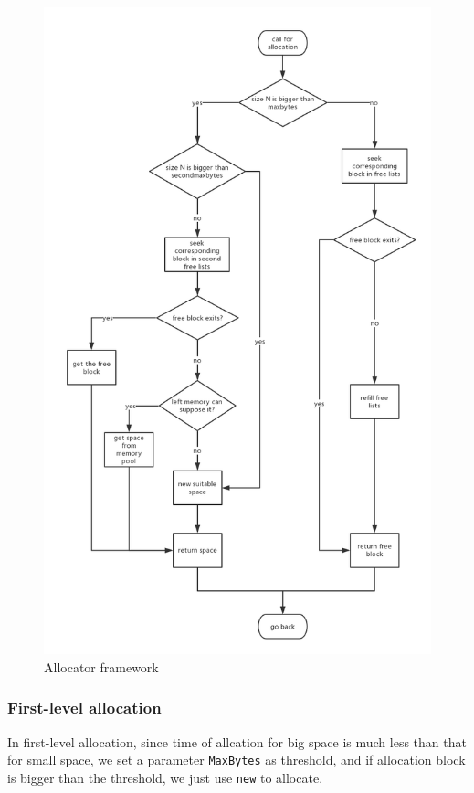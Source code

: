 \documentclass{article}
\begin{document}
\begin{figure}
	\centering
	\includegraphics[]{frame.png}
	\caption{Allocator framework\label{framework}}
\end{figure}

\subsubsection{First-level allocation}
In first-level allocation, since time of allcation for big space is much less than that for small space, we set a parameter \texttt{MaxBytes} as threshold, and if allocation block is bigger than the threshold, we just use \texttt{new} to allocate. 
\end{document}
